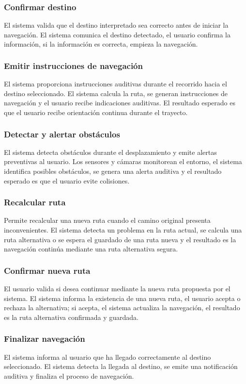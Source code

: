 \subsubsection {Confirmar destino}
El sistema valida que el destino interpretado sea correcto antes de iniciar la navegación.
El sistema comunica el destino detectado, el usuario confirma la información,
si la información es correcta, empieza la navegación.
\subsubsection {Emitir instrucciones de navegación}
El sistema proporciona instrucciones auditivas durante el recorrido hacia el destino seleccionado.
El sistema calcula la ruta, se generan instrucciones de navegación y el usuario recibe indicaciones auditivas. El resultado esperado es que el usuario recibe orientación continua durante el trayecto.
\subsubsection {Detectar y alertar obstáculos}
El sistema detecta obstáculos durante el desplazamiento y emite alertas preventivas al usuario.
Los sensores y cámaras monitorean el entorno, el sistema identifica posibles obstáculos, se genera una alerta auditiva y el resultado esperado es que el usuario evite colisiones.
\subsubsection {Recalcular ruta}
Permite recalcular una nueva ruta cuando el camino original presenta inconvenientes.
El sistema detecta un problema en la ruta actual, se calcula una ruta alternativa o se espera el guardado de una ruta nueva y el resultado es la navegación continúa mediante una ruta alternativa segura.
\subsubsection {Confirmar nueva ruta}
El usuario valida si desea continuar mediante la nueva ruta propuesta por el sistema.
El sistema informa la existencia de una nueva ruta, el usuario acepta o rechaza la alternativa; si acepta, el sistema actualiza la navegación, el resultado es la ruta alternativa confirmada y guardada.
\subsubsection {Finalizar navegación}
El sistema informa al usuario que ha llegado correctamente al destino seleccionado.
El sistema detecta la llegada al destino, se emite una notificación auditiva y finaliza el proceso de navegación.

